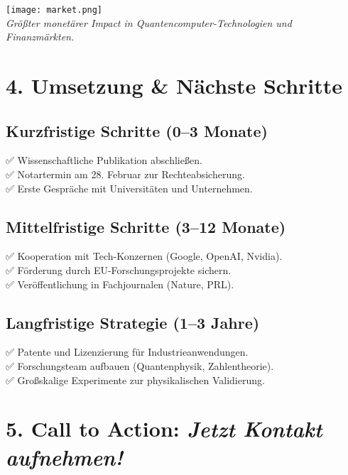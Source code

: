 \documentclass[a4paper,10pt]{article}
\begin{document}
\begin{center}
    \texttt{[image: market.png]} \\[0.3cm]
    \textit{Größter monetärer Impact in Quantencomputer-Technologien und Finanzmärkten.}
\end{center}

\vspace{0.3cm}

\section*{4. Umsetzung \& Nächste Schritte}

\subsection*{Kurzfristige Schritte (0–3 Monate)}

✅ Wissenschaftliche Publikation abschließen. \\
✅ Notartermin am 28. Februar zur Rechteabsicherung. \\
✅ Erste Gespräche mit Universitäten und Unternehmen. \\

\subsection*{Mittelfristige Schritte (3–12 Monate)}

✅ Kooperation mit Tech-Konzernen (Google, OpenAI, Nvidia). \\
✅ Förderung durch EU-Forschungsprojekte sichern. \\
✅ Veröffentlichung in Fachjournalen (Nature, PRL). \\

\subsection*{Langfristige Strategie (1–3 Jahre)}

✅ Patente und Lizenzierung für Industrieanwendungen. \\
✅ Forschungsteam aufbauen (Quantenphysik, Zahlentheorie). \\
✅ Großskalige Experimente zur physikalischen Validierung. \\

\vspace{0.5cm}

\section*{5. Call to Action: \textit{Jetzt Kontakt aufnehmen!}}
\end{document}
